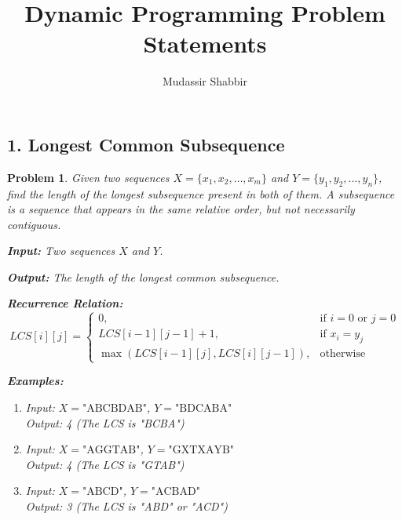 \documentclass{article}
\newtheorem{problem}{Problem}
\begin{document}
\title{Dynamic Programming Problem Statements}
\author{Mudassir Shabbir}
\maketitle


\subsection*{1. Longest Common Subsequence}
\begin{problem}
Given two sequences $X = \{x_1, x_2, \ldots, x_m\}$ and $Y = \{y_1, y_2, \ldots, y_n\}$, find the length of the longest subsequence present in both of them. A subsequence is a sequence that appears in the same relative order, but not necessarily contiguous.

\textbf{Input:} Two sequences $X$ and $Y$.

\textbf{Output:} The length of the longest common subsequence.

\textbf{Recurrence Relation:}
\[
LCS[i][j] = 
\begin{cases}
0, & \text{if } i = 0 \text{ or } j = 0 \\
LCS[i-1][j-1] + 1, & \text{if } x_i = y_j \\
\max(LCS[i-1][j], LCS[i][j-1]), & \text{otherwise}
\end{cases}
\]

\textbf{Examples:}
\begin{enumerate}
\item Input: $X = \text{"ABCBDAB"}$, $Y = \text{"BDCABA"}$ \\
      Output: 4 (The LCS is "BCBA")
\item Input: $X = \text{"AGGTAB"}$, $Y = \text{"GXTXAYB"}$ \\
      Output: 4 (The LCS is "GTAB")
\item Input: $X = \text{"ABCD"}$, $Y = \text{"ACBAD"}$ \\
      Output: 3 (The LCS is "ABD" or "ACD")
\end{enumerate}
\end{problem}

\end{document}
